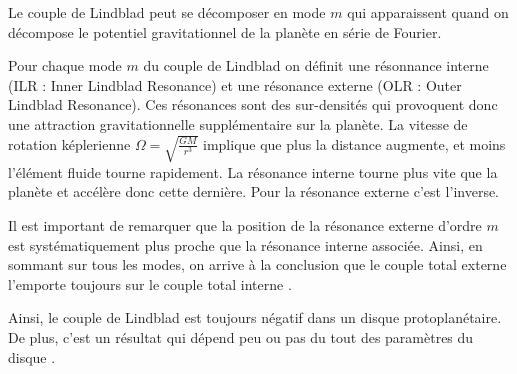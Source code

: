 


Le couple de Lindblad peut se décomposer en mode $m$ qui apparaissent quand on décompose le potentiel gravitationnel de la planète en série de Fourier. 

Pour chaque mode $m$ du couple de Lindblad on définit une résonnance interne (ILR : Inner Lindblad Resonance) et une résonance externe (OLR : Outer Lindblad Resonance). Ces résonances sont des sur-densités qui provoquent donc une attraction gravitationnelle supplémentaire sur la planète. La vitesse de rotation képlerienne $\Omega = \sqrt{\frac{GM}{r^3}}$ implique que plus la distance augmente, et moins l'élément fluide tourne rapidement. La résonance interne tourne plus vite que la planète et accélère donc cette dernière. Pour la résonance externe c'est l'inverse. 

Il est important de remarquer que la position de la résonance externe d'ordre $m$ est systématiquement plus proche que la résonance interne associée. Ainsi, en sommant sur tous les modes, on arrive à la conclusion que le couple total externe l'emporte toujours sur le couple total interne \citep{ward1997protoplanet}. 

Ainsi, le couple de Lindblad est toujours négatif dans un disque protoplanétaire. De plus, c'est un résultat qui dépend peu ou pas du tout des paramètres du disque \citep{ward1997protoplanet}.

